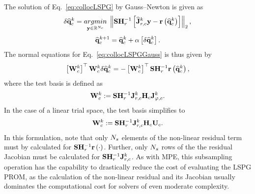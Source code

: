 The solution of Eq.~\ref{eq:collocLSPG} by Gauss--Newton is given as
%
\begin{equation}\label{eq:collocLSPGGauss}
    \delta \consVecCoef^{\newtonIdx} = \argmin{\dummyVec \inROne{\numConsModes}} \left\Vert \sampMat \resScaleInv \left[\jacobResCoefCons^{\newtonIdx} \dummyVec - \resFunc{\consVecCoef^{\newtonIdx}}\right] \right\Vert_2,
\end{equation}
\begin{equation}
    \mathbf{\widehat{q}}_{c}^{k + 1} = \mathbf{\widehat{q}}_{c}^{k} + \alpha \left[ \delta \mathbf{\widehat{q}}_{c}^{k} \right].
\end{equation}
%
The normal equations for Eq.~\ref{eq:collocLSPGGauss} is thus given by
%
\begin{equation}
    \left[\testBasisCons^{\newtonIdx}\right]^\top \testBasisCons^{\newtonIdx} \delta \consVecCoef^{\newtonIdx} = -\left[\testBasisCons^{\newtonIdx}\right]^\top \sampMat \resScaleInv \resFunc{\consVecCoef^{\newtonIdx}},
\end{equation}
%
where the test basis is defined as
%
\begin{equation}
    \testBasisCons^\newtonIdx \defEq \sampMat \resScaleInv \jacobResCons^\newtonIdx \jacobDecodeCons^{\newtonIdx}.
\end{equation}
%
In the case of a linear trial space, the test basis simplifies to
%
\begin{equation}
    \testBasisCons^\newtonIdx \defEq \sampMat \resScaleInv \jacobResCons^\newtonIdx \consScale \consTrial.
\end{equation}
%
In this formulation, note that only $N_s$ elements of the non-linear residual term must by calculated for $\sampMat \resScaleInv \resFunc{\cdot}$. Further, only $N_s$ rows of the the residual Jacobian must be calculated for $\sampMat \resScaleInv \jacobResCons^\newtonIdx$. As with MPE, this subsampling operation has the capability to drastically reduce the cost of evaluating the LSPG PROM, as the calculation of the non-linear residual and its Jacobian usually dominates the computational cost for solvers of even moderate complexity.

